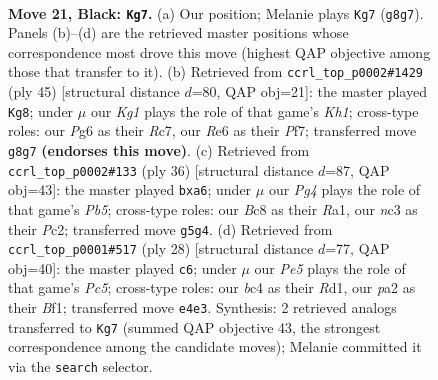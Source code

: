 \documentclass[11pt]{article}
\begin{document}
\clearpage

\begin{figure}[p]\centering
\begin{subfigure}{0.46\textwidth}\centering
\resizebox{\linewidth}{!}{%
\newchessgame
\chessboard[
  setfen={r1b3k1/pp1n3p/2pqr1p1/6p1/2BPp3/2N2PP1/PP3K1P/2RQR3 b - - 1 21},
  showmover=false,
  pgfstyle=straightmove, color=movearrow, markmove={g8-g7}
]}
\caption{}
\end{subfigure}\hfill
\begin{subfigure}{0.46\textwidth}\centering
\resizebox{\linewidth}{!}{%
\newchessgame
\chessboard[
  setfen={4r2k/ppr2pp1/1npqb2p/8/1P1P4/P2B1N1P/2Q2PP1/2R1R1K1 b - - 1 23},
  showmover=false,
  pgfstyle=straightmove, color=movearrow, markmove={h8-g8}
]}
\caption{}
\end{subfigure}
\\[4pt]
\begin{subfigure}{0.46\textwidth}\centering
\resizebox{\linewidth}{!}{%
\newchessgame
\chessboard[
  setfen={r2qr2k/1pp3pp/1n1p1b2/pP3Q2/5P2/2N1B3/1PP3PP/R3R1K1 w - a6 0 19},
  showmover=false,
  pgfstyle=straightmove, color=movearrow, markmove={b5-a6}
]}
\caption{}
\end{subfigure}\hfill
\begin{subfigure}{0.46\textwidth}\centering
\resizebox{\linewidth}{!}{%
\newchessgame
\chessboard[
  setfen={2rq1rk1/pb3ppp/1p2p3/2PnN3/8/6Q1/PPP2PPP/2KR1B1R w - - 3 15},
  showmover=false,
  pgfstyle=straightmove, color=movearrow, markmove={c5-c6}
]}
\caption{}
\end{subfigure}
\caption{\textbf{Move 21, Black: \texttt{Kg7}.} (a) Our position; Melanie plays \texttt{Kg7} (\texttt{g8g7}). Panels (b)--(d) are the retrieved master positions whose correspondence most drove this move (highest QAP objective among those that transfer to it). (b) Retrieved from \texttt{ccrl\_top\_p0002\#1429} (ply 45) [structural distance $d$=80, QAP obj=21]: the master played \texttt{Kg8}; under $\mu$ our \emph{Kg1} plays the role of that game's \emph{Kh1}; cross-type roles: our \emph{P}g6 as their \emph{R}c7, our \emph{R}e6 as their \emph{P}f7; transferred move \texttt{g8g7} \textbf{(endorses this move)}. (c) Retrieved from \texttt{ccrl\_top\_p0002\#133} (ply 36) [structural distance $d$=87, QAP obj=43]: the master played \texttt{bxa6}; under $\mu$ our \emph{Pg4} plays the role of that game's \emph{Pb5}; cross-type roles: our \emph{B}c8 as their \emph{R}a1, our \emph{n}c3 as their \emph{P}c2; transferred move \texttt{g5g4}. (d) Retrieved from \texttt{ccrl\_top\_p0001\#517} (ply 28) [structural distance $d$=77, QAP obj=40]: the master played \texttt{c6}; under $\mu$ our \emph{Pe5} plays the role of that game's \emph{Pc5}; cross-type roles: our \emph{b}c4 as their \emph{R}d1, our \emph{p}a2 as their \emph{B}f1; transferred move \texttt{e4e3}. Synthesis: 2 retrieved analogs transferred to \texttt{Kg7} (summed QAP objective 43, the strongest correspondence among the candidate moves); Melanie committed it via the \texttt{search} selector.}
\label{fig:thought-m41}
\end{figure}
\end{document}
